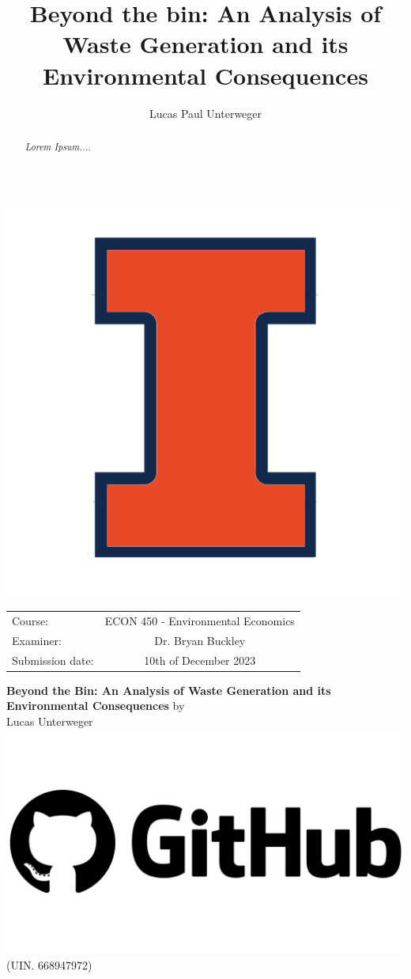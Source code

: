 \documentclass[12pt,a4paper]{article}
\author{Lucas Paul Unterweger}
\title{Beyond the bin: An Analysis of Waste Generation and its Environmental Consequences}
\begin{document}
\begin{titlepage}
\center
\vfill
\includegraphics[scale=0.15]{UIUC.png}
\vfill
\begin{tabular}[t]{lc}
Course:  & ECON 450 - Environmental Economics \\
Examiner: & 
Dr. Bryan Buckley \\
Submission date: & 10th of December 2023 \\
\end{tabular}
\vfill
{\large \textbf{Beyond the Bin: An Analysis of Waste Generation and its Environmental Consequences}}
\vfill
by\\ \vspace{3mm}
{\Large Lucas Unterweger \href{https://github.com/therealLucasPaul}{\includegraphics[scale=0.01]{GitHub.png}}}\\
(UIN. 668947972)\\
\vfill

\thispagestyle{empty}
\pagebreak
\end{titlepage}
\thispagestyle{empty}
\begin{abstract}
\textit{Lorem Ipsum....} 
\end{abstract}
\clearpage
\thispagestyle{plain}
\tableofcontents
\pagebreak
{}
\end{document}
